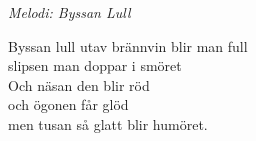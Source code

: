 {\footnotesize\textit{Melodi: Byssan Lull}}\par
\vspace{10pt}
\revrpt Byssan lull utav brännvin blir man full\\
slipsen man doppar i smöret\rpt\\
Och näsan den blir röd\\
och ögonen får glöd\\
men tusan så glatt blir humöret.
